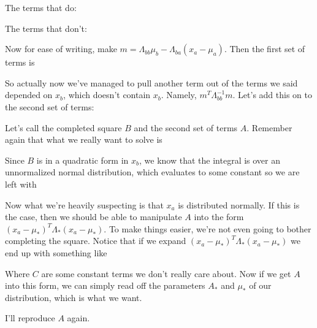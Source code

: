 \documentclass[12pt]{article}
\begin{document}
The terms that do:

The terms that don't:

Now for ease of writing, make $m = \Lambda_{bb}\mu_b - \Lambda_{ba} (x_a-\mu_a)$. Then the first set of terms is

So actually now we've managed to pull another term out of the terms we said depended on $x_b$, which doesn't contain $x_b$. Namely, $m^T \Lambda_{bb}^{-1} m$. Let's add this on to the second set of terms:


Let's call the completed square $B$ and the second set of terms $A$. Remember again that what we really want to solve is


Since $B$ is in a quadratic form in $x_b$, we know that the integral is over an unnormalized normal distribution, which evaluates to some constant so we are left with

Now what we're heavily suspecting is that $x_a$ is distributed normally. If this is the case, then we should be able to manipulate $A$ into the form $(x_a - \mu_*)^T \Lambda_* (x_a - \mu_*)$. To make things easier, we're not even going to bother completing the square. Notice that if we expand $(x_a - \mu_*)^T \Lambda_* (x_a - \mu_*)$ we end up with something like


Where $C$ are some constant terms we don't really care about. Now if we get $A$ into this form, we can simply read off the parameters $A_*$ and $\mu_*$ of our distribution, which is what we want.

I'll reproduce $A$ again.
\end{document}
